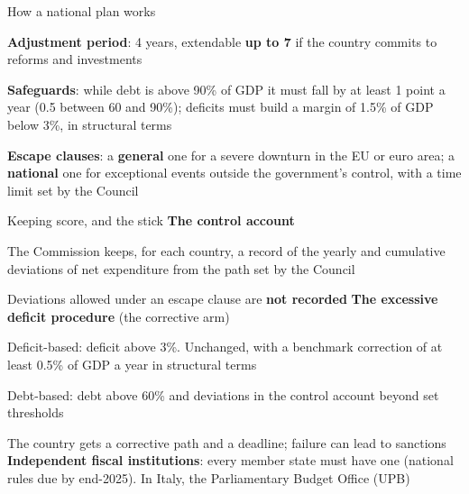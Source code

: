 \documentclass[aspectratio=169,xcolor=table]{beamer}
\begin{document}
\begin{frame}{How a national plan works}
\centering
{}
\vspace{0.3cm}

\raggedright\footnotesize
\bi
  \item \textbf{Adjustment period}: 4 years, extendable \textbf{up to 7} if the country commits to reforms and investments
  \item \textbf{Safeguards}: while debt is above 90\% of GDP it must fall by at least 1 point a year (0.5 between 60 and 90\%); deficits must build a margin of 1.5\% of GDP below 3\%, in structural terms
  \item \textbf{Escape clauses}: a \textbf{general} one for a severe downturn in the EU or euro area; a \textbf{national} one for exceptional events outside the government's control, with a time limit set by the Council
\ei
{}
\end{frame}

\begin{frame}{Keeping score, and the stick}
\footnotesize
\textbf{The control account}
\bi
  \item The Commission keeps, for each country, a record of the yearly and cumulative deviations of net expenditure from the path set by the Council
  \item Deviations allowed under an escape clause are \textbf{not recorded}
\ei
\vspace{0.1cm}
\textbf{The excessive deficit procedure} (the corrective arm)
\bi
  \item Deficit-based: deficit above 3\%. Unchanged, with a benchmark correction of at least 0.5\% of GDP a year in structural terms
  \item Debt-based: debt above 60\% and deviations in the control account beyond set thresholds
  \item The country gets a corrective path and a deadline; failure can lead to sanctions
\ei
\vspace{0.1cm}
\textbf{Independent fiscal institutions}: every member state must have one (national rules due by end-2025). In Italy, the Parliamentary Budget Office (UPB)
\end{frame}
\end{document}
